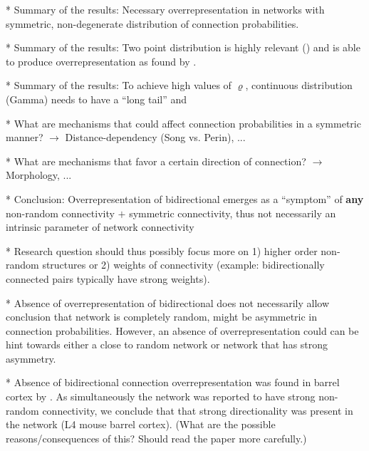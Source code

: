 

* Summary of the results: Necessary overrepresentation in networks with symmetric, non-degenerate distribution of connection probabilities.

* Summary of the results: Two point distribution is highly relevant (\cite{Lee2016}) and is able to produce overrepresentation as found by \cite{Song2005}.

* Summary of the results: To achieve high values of $\varrho$, continuous distribution (Gamma) needs to have a \enquote{long tail} and 

* What are mechanisms that could affect connection probabilities in a symmetric manner? $\rightarrow$ Distance-dependency (Song vs. Perin), ...

* What are mechanisms that favor a certain direction of connection? $\rightarrow$ Morphology, ...

* Conclusion: Overrepresentation of bidirectional emerges as a \enquote{symptom} of \textbf{any} non-random connectivity $+$ symmetric connectivity, thus not necessarily an intrinsic parameter of network connectivity

* Research question should thus possibly focus more on 1) higher order non-random structures or 2) weights of connectivity (example: bidirectionally connected pairs typically have strong weights). 

* Absence of overrepresentation of bidirectional does not necessarily allow conclusion that network is completely random, might be asymmetric in connection probabilities. However, an absence of overrepresentation could can be hint towards either a close to random network or network that has strong asymmetry.

* Absence of bidirectional connection overrepresentation was found in barrel cortex by \cite{Lefort2009}. As simultaneously the network was reported to have strong non-random connectivity, we conclude that that strong directionality was present in the network (L4 mouse barrel cortex). (What are the possible reasons/consequences of this? Should read the paper more carefully.)

